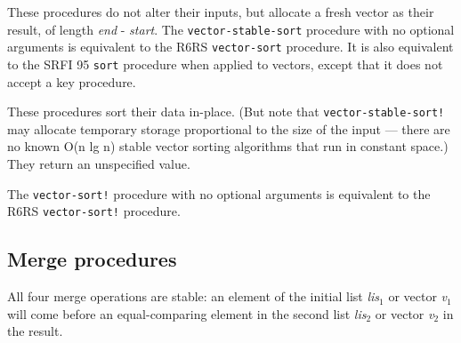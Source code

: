 \begin{entry}{%
  }

  These procedures do not alter their inputs, but allocate a fresh
  vector as their result, of length \emph{end} - \emph{start}. The
  \texttt{vector-stable-sort} procedure with no optional arguments is
  equivalent to the R6RS \texttt{vector-sort} procedure. It is also
  equivalent to the SRFI 95 \texttt{sort} procedure when applied to
  vectors, except that it does not accept a key procedure.
\end{entry}

\begin{entry}{%
   }

  These procedures sort their data in-place. (But note that
  \texttt{vector-stable-sort!} may allocate temporary storage
  proportional to the size of the input --- there are no known O(n lg
  n) stable vector sorting algorithms that run in constant space.)
  They return an unspecified value.

  The \texttt{vector-sort!} procedure with no optional arguments is
  equivalent to the R6RS \texttt{vector-sort!} procedure.
\end{entry}

\subsection{Merge procedures}\label{Mergeprocedures}

All four merge operations are stable: an element of the initial list
\emph{lis$_1$} or vector \emph{v$_1$} will
come before an equal-comparing element in the second list
\emph{lis$_2$} or vector \emph{v$_2$} in the
result.

